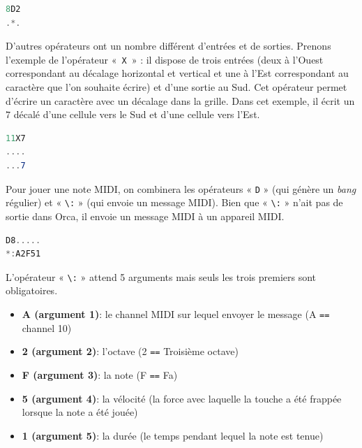 \begin{minipage}{\linewidth}
\begin{lstlisting}[language=GLSL, caption=Opérateur « \lstinline{D} »,captionpos=b,frame=single]
8D2
.*.
\end{lstlisting}
\end{minipage}

D'autres opérateurs ont un nombre différent d'entrées et de sorties. Prenons l'exemple de l'opérateur \mbox{« \lstinline{X} »} : il dispose de trois entrées (deux à l'Ouest correspondant au décalage horizontal et vertical et une à l'Est correspondant au caractère que l'on souhaite écrire) et d'une sortie au Sud. Cet opérateur permet d'écrire un caractère avec un décalage dans la grille. Dans cet exemple, il écrit un $7$ décalé d'une cellule vers le Sud et d'une cellule vers l'Est.

 
\begin{minipage}{\linewidth}
\begin{lstlisting}[language=GLSL, caption=Opérateur « \lstinline{X} »,captionpos=b,frame=single]
11X7
....
...7
\end{lstlisting}
\end{minipage}

Pour jouer une note MIDI, on combinera les opérateurs « \lstinline{D} » (qui génère un \textit{bang} régulier) et « \lstinline{\:} » (qui envoie un message MIDI). Bien que « \lstinline{\:} » n'ait pas de sortie dans Orca, il envoie un message MIDI à un appareil MIDI.

\begin{minipage}{\linewidth}
\begin{lstlisting}[language=GLSL, caption=Jouer une note MIDI,captionpos=b,frame=single]
D8.....
*:A2F51
\end{lstlisting}
\end{minipage}


\begin{minipage}{\linewidth}
L'opérateur « \lstinline{\:} » attend 5 arguments mais seuls les trois premiers sont obligatoires.
\begin{itemize}
    \item \textbf{A (argument 1)}: le channel MIDI sur lequel envoyer le message (A \lstinline{==} channel 10)
    \item \textbf{2 (argument 2)}: l'octave (2 \lstinline{==} Troisième octave)
    \item \textbf{F (argument 3)}: la note (F \lstinline{==} Fa)
    \item \textbf{5 (argument 4)}: la vélocité (la force avec laquelle la touche a été frappée lorsque la note a été jouée)
    \item \textbf{1 (argument 5)}: la durée (le temps pendant lequel la note est tenue)
\end{itemize}
\end{minipage}

